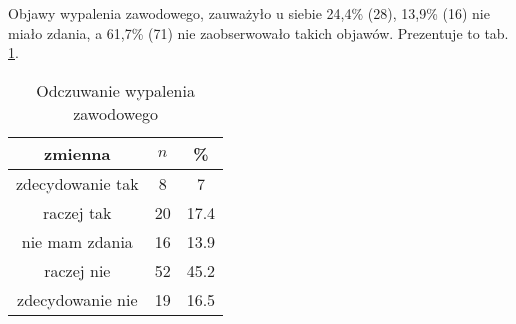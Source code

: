 Objawy wypalenia zawodowego, zauważyło u siebie 24,4\% (28), 13,9\% (16) nie miało zdania, a 61,7\% (71) nie zaobserwowało takich objawów. Prezentuje to tab. \ref{tab:Q35}.

\begin{table}[H]
\caption{Odczuwanie wypalenia zawodowego}
\centering
\begin{tabular}{ | c | c | c |}
\hline
zmienna & $n$ & \% \\
\hline
zdecydowanie tak  &  8  & 7 \\
\hline
raczej tak  &  20  & 17.4 \\
\hline
nie mam zdania  &  16  & 13.9 \\
\hline
raczej nie  &  52  & 45.2 \\
\hline
zdecydowanie nie  &  19  & 16.5\\
\hline
\end{tabular}
\label{tab:Q35}
\end{table}
